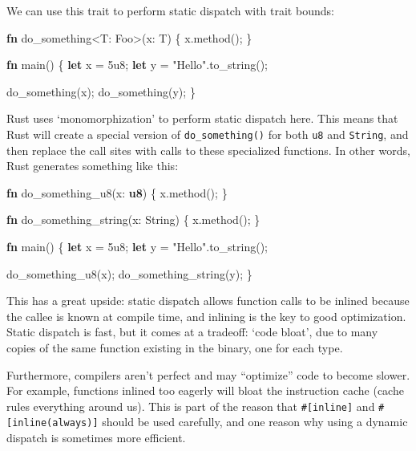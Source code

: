 \documentclass[a4paper,]{book}
\newenvironment{Shaded}{\begin{snugshade}}{\end{snugshade}}
\newcommand{\KeywordTok}[1]{\textcolor[rgb]{0.13,0.29,0.53}{\textbf{{#1}}}}
\newcommand{\DecValTok}[1]{\textcolor[rgb]{0.00,0.00,0.81}{{#1}}}
\newcommand{\StringTok}[1]{\textcolor[rgb]{0.31,0.60,0.02}{{#1}}}
\newcommand{\NormalTok}[1]{{#1}}
\begin{document}
We can use this trait to perform static dispatch with trait bounds:

\begin{Shaded}
\begin{Highlighting}[]
\KeywordTok{fn} \NormalTok{do_something<T: Foo>(x: T) \{}
    \NormalTok{x.method();}
\NormalTok{\}}

\KeywordTok{fn} \NormalTok{main() \{}
    \KeywordTok{let} \NormalTok{x = }\DecValTok{5u8}\NormalTok{;}
    \KeywordTok{let} \NormalTok{y = }\StringTok{"Hello"}\NormalTok{.to_string();}

    \NormalTok{do_something(x);}
    \NormalTok{do_something(y);}
\NormalTok{\}}
\end{Highlighting}
\end{Shaded}

Rust uses `monomorphization' to perform static dispatch here. This means
that Rust will create a special version of \texttt{do\_something()} for
both \texttt{u8} and \texttt{String}, and then replace the call sites
with calls to these specialized functions. In other words, Rust
generates something like this:

\begin{Shaded}
\begin{Highlighting}[]
\KeywordTok{fn} \NormalTok{do_something_u8(x: }\KeywordTok{u8}\NormalTok{) \{}
    \NormalTok{x.method();}
\NormalTok{\}}

\KeywordTok{fn} \NormalTok{do_something_string(x: String) \{}
    \NormalTok{x.method();}
\NormalTok{\}}

\KeywordTok{fn} \NormalTok{main() \{}
    \KeywordTok{let} \NormalTok{x = }\DecValTok{5u8}\NormalTok{;}
    \KeywordTok{let} \NormalTok{y = }\StringTok{"Hello"}\NormalTok{.to_string();}

    \NormalTok{do_something_u8(x);}
    \NormalTok{do_something_string(y);}
\NormalTok{\}}
\end{Highlighting}
\end{Shaded}

This has a great upside: static dispatch allows function calls to be
inlined because the callee is known at compile time, and inlining is the
key to good optimization. Static dispatch is fast, but it comes at a
tradeoff: `code bloat', due to many copies of the same function existing
in the binary, one for each type.

Furthermore, compilers aren't perfect and may ``optimize'' code to
become slower. For example, functions inlined too eagerly will bloat the
instruction cache (cache rules everything around us). This is part of
the reason that \texttt{\#{[}inline{]}} and
\texttt{\#{[}inline(always){]}} should be used carefully, and one reason
why using a dynamic dispatch is sometimes more efficient.
\end{document}
